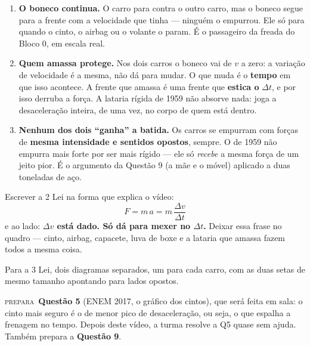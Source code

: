 \documentclass[11pt,a4paper]{article}
\newcommand{\campo}[2]{%
  \par{\small\scshape\color{vinho}#1}\ #2\par}
\begin{document}
\begin{enumerate}[leftmargin=2.4em, itemsep=0.55em]
  \item[\textbf{1\textordfeminine{}}] \textbf{O boneco continua.} O carro
        para contra o outro carro, mas o boneco segue para a frente com
        a velocidade que tinha --- ningu\'em o empurrou. Ele s\'o para
        quando o cinto, o airbag ou o volante o param. \'E o passageiro
        da freada do Bloco 0, em escala real.

  \item[\textbf{2\textordfeminine{}}] \textbf{Quem amassa protege.} Nos
        dois carros o boneco vai de $v$ a zero: a varia\c{c}\~ao de
        velocidade \'e a mesma, n\~ao d\'a para mudar. O que muda \'e o
        \textbf{tempo} em que isso acontece. A frente que amassa \'e uma
        frente que \textbf{estica o} $\Delta t$, e por isso derruba a
        for\c{c}a. A lataria r\'igida de 1959 n\~ao absorve nada: joga a
        desacelera\c{c}\~ao inteira, de uma vez, no corpo de quem est\'a
        dentro.

  \item[\textbf{3\textordfeminine{}}] \textbf{Nenhum dos dois ``ganha''
        a batida.} Os carros se empurram com for\c{c}as de
        \textbf{mesma intensidade e sentidos opostos}, sempre. O de 1959
        n\~ao empurra mais forte por ser mais r\'igido --- ele s\'o
        \textit{recebe} a mesma for\c{c}a de um jeito pior. \'E o
        argumento da Quest\~ao 9 (a m\~ae e o m\'ovel) aplicado a duas
        toneladas de a\c{c}o.
\end{enumerate}

\begin{quadro}
Escrever a 2\textordfeminine{} Lei na forma que explica o v\'ideo:
\[
  F = m\,a = m\,\frac{\Delta v}{\Delta t}
\]
e ao lado: \textbf{$\Delta v$ est\'a dado. S\'o d\'a para mexer no
$\Delta t$.} Deixar essa frase no quadro --- cinto, airbag, capacete,
luva de boxe e a lataria que amassa fazem todos a mesma coisa.

\smallskip
Para a 3\textordfeminine{} Lei, dois diagramas separados, um para cada
carro, com as duas setas de mesmo tamanho apontando para lados opostos.
\end{quadro}

\campo{prepara}{\textbf{Quest\~ao 5} (ENEM 2017, o gr\'afico dos cintos),
que ser\'a feita em sala: o cinto mais seguro \'e o de menor pico de
desacelera\c{c}\~ao, ou seja, o que espalha a frenagem no tempo. Depois
deste v\'ideo, a turma resolve a Q5 quase sem ajuda. Tamb\'em prepara a
\textbf{Quest\~ao 9}.}
\end{document}
